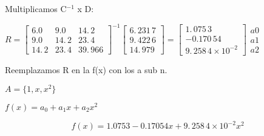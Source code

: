 \documentclass{article}
\begin{document}
\bigskip 

Multiplicamos C$^{-1}$ x D:

\bigskip $R=\left[ 
\begin{array}{ccc}
6.0 & 9.0 & 14.\,\allowbreak 2 \\ 
9.0 & 14.\,\allowbreak 2 & 23.\,\allowbreak 4 \\ 
14.\,\allowbreak 2 & 23.\,\allowbreak 4 & 39.\,\allowbreak 966%
\end{array}%
\right] ^{-1}\left[ 
\begin{array}{c}
6.\,\allowbreak 231\,7 \\ 
9.\,\allowbreak 422\,6 \\ 
14.\,\allowbreak 979%
\end{array}%
\right] =\allowbreak \left[ 
\begin{array}{c}
1.\,\allowbreak 075\,3 \\ 
-0.170\,54 \\ 
9.\,\allowbreak 258\,4\times 10^{-2}%
\end{array}%
\right] \allowbreak 
\begin{array}{c}
a0 \\ 
a1 \\ 
a2%
\end{array}%
$

\bigskip Reemplazamos R en la f(x) con los a sub n.

$A=\{1,x,x^{2}\}$

$f(x)=a_{0}+a_{1}x+a_{2}x^{2}$

\[
f(x)=1.0753-0.17054x+9.\,\allowbreak 258\,4\times 10^{-2}x^{2}
\]
\end{document}
